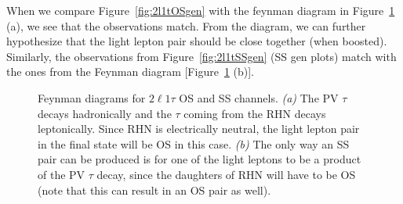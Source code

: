 \documentclass[letterpaper,12pt]{article}
\begin{document}
When we compare Figure~\ref{fig:2l1tOSgen} with the feynman diagram in Figure~\ref{fig:2l1tgenfeyn} (a), we see that the observations match. From the diagram, we can further hypothesize that the light lepton pair should be close together (when boosted). Similarly, the observations from Figure~\ref{fig:2l1tSSgen} (SS gen plots) match with the ones from the Feynman diagram [Figure~\ref{fig:2l1tgenfeyn} (b)].

\begin{figure}[h]
  \centering
  \qquad
  \caption{Feynman diagrams for $2\ell1\tau$ OS and SS channels. \emph{(a)} The PV $\tau$ decays hadronically and the $\tau$ coming from the RHN decays leptonically. Since RHN is electrically neutral, the light lepton pair in the final state will be OS in this case. \emph{(b)} The only way an SS pair can be produced is for one of the light leptons to be a product of the PV $\tau$ decay, since the daughters of RHN will have to be OS (note that this can result in an OS pair as well).}
  \label{fig:2l1tgenfeyn}
\end{figure}

\clearpage
\end{document}
